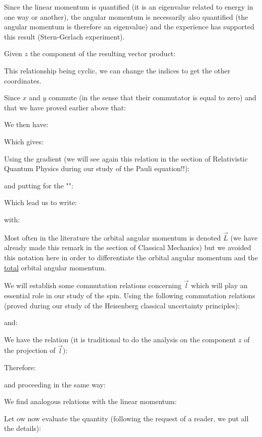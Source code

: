 	Since the linear momentum is quantified (it is an eigenvalue related to energy in one way or another), the angular momentum is necessarily also quantified (the angular momentum is therefore an eigenvalue) and the experience has supported this result (Stern-Gerlach experiment).

	Given $z$ the component of the resulting vector product:
	
	This relationship being cyclic, we can change the indices to get the other coordinates.

	Since $x$ and $y$ commute (in the sense that their commutator is equal to zero) and that we have proved earlier above that:
	
	We then have:
	
	Which gives:
	
	Using the gradient (we will see again this relation in the section of Relativistic Quantum Physics during our study of the Pauli equation!!):
	
	and putting for the "":
	
	Which lead us to write:
	
	with:
	
	\begin{tcolorbox}[title=Remark,colframe=black,arc=10pt]
	Most often in the literature the orbital angular momentum is denoted $\vec{L}$ (we have already made this remark in the section of Classical Mechanics) but we avoided this notation here in order to differentiate the orbital angular momentum and the \underline{total} orbital angular momentum.
	\end{tcolorbox}
	We will establish some commutation relations concerning $\vec{l}$ which will play an essential role in our study of the spin. Using the following commutation relations (proved during our study of the Heisenberg classical uncertainty principles):
	
	and:
	
	We have the relation (it is traditional to do the analysis on the component $z$ of the projection of $\vec{l}$):
	
	Therefore:
	
	and proceeding in the same way:
	
	\begin{tcolorbox}[title=Remark,colframe=black,arc=10pt]
	We find analogous relations with the linear momentum:
	
	\end{tcolorbox}
	Let ow now evaluate the quantity (following the request of a reader, we put all the details):
	
